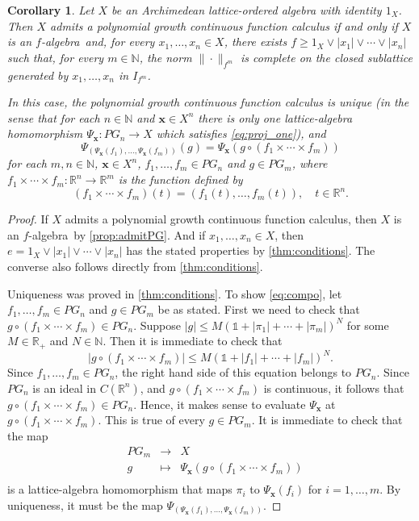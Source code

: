 \documentclass{amsart}
\theoremstyle{plain}
\newtheorem{cor}[thm]{Corollary}
\theoremstyle{definition}
\theoremstyle{remark}
\newcommand\N{\ensuremath{\mathbb{N}}}
\newcommand\R{\ensuremath{\mathbb{R}}}
\newcommand{\one}{\mathbb{1}}
\newcommand{\falg}{$f\!$-algebra}
\newcommand{\Psx}{\Psi_{\bm x}}
\begin{document}
\begin{cor}\label{cor:conditions}
    Let $X$ be an Archimedean lattice-ordered algebra with identity
    $1_X$. Then
    $X$ admits a polynomial growth continuous function calculus if and
    only if $X$ is an \falg\ and, for every $x_1,\ldots ,x_n \in X$,
    there exists $f\ge 1_X\vee |x_1|\vee \cdots
    \vee |x_n|$ such that, for every $m \in \N$, the norm
    $\|{\cdot }\|_{f^{m}}$ is complete on the closed sublattice
    generated by $x_1,\ldots ,x_n$ in $I_{f^{m}}$.

    In this case, the polynomial growth continuous function calculus
    is unique (in the sense that for each $n \in \N$ and $\bm x \in
    X^{n}$ there is only one lattice-algebra homomorphism $\Psx\colon
    PG_n\to X$ which satisfies \eqref{eq:proj_one}), and
    \begin{equation}\label{eq:compo}
        \Psi _{(\Psi _{\bm x}(f_1),\ldots ,\Psi _{\bm x}(f_m))}(g)=\Psi
        _{\bm x}(g\circ (f_1\times \cdots \times f_m))
    \end{equation}
    for each $m,n \in \N$, $\bm x \in X^{n}$, $f_1,\ldots ,f_m \in
    PG_n$ and $g \in PG_{m}$, where $f_1\times \cdots \times f_m\colon
    \R^{n}\to \R^{m}$ is the function defined by
    \[
        (f_1\times \cdots \times f_m)(t)=(f_1(t),\ldots ,f_m(t)),\quad
        t \in \R^{n}.
    \]
\end{cor}
\begin{proof}
    If $X$ admits a polynomial growth continuous function calculus,
    then $X$ is an \falg\ by \cref{prop:admitPG}. And if $x_1,\ldots ,x_n \in X$, then
    $e=1_X\vee|x_1|\vee \cdots \vee |x_n| $ has the stated properties
    by \cref{thm:conditions}. The converse also follows directly from \cref{thm:conditions}.

    Uniqueness was proved in \cref{thm:conditions}. To show
    \eqref{eq:compo}, let $f_1,\ldots ,f_m \in PG_n$ and $g \in PG_m$
    be as stated. First we need to check that $g\circ (f_1\times
    \cdots \times f_m) \in PG_n$. Suppose $|g|\le M (\one + |\pi _1| + \cdots +
    |\pi _m|)^{N}$ for some $M\in \R_+$ and $N \in \N$. Then it is immediate
    to check that
    \[
    |g\circ (f_1\times \cdots \times f_m)|\le M(\one + |f_1| + \cdots
    + |f_m|)^{N}.
    \]
    Since $f_1,\ldots ,f_m \in PG_n$, the right hand side of this
    equation belongs to $PG_n$. Since $PG_n$ is an ideal in
    $C(\R^{n})$, and $g\circ (f_1\times \cdots \times f_m)$ is
    continuous, it follows that $g\circ (f_1\times \cdots \times f_m)
    \in PG_n$. Hence, it makes sense to evaluate $\Psx$ at $g\circ (f_1\times
    \cdots \times f_m)$. This is true of every $g \in PG_m$.
    It is immediate to check that the map
    \[
    \begin{array}{cccc}
            & PG_m & \longrightarrow & X \\
            & g & \longmapsto & \Psx(g\circ (f_1\times \cdots \times
            f_m)) \\
    \end{array}
    \]
    is a lattice-algebra homomorphism that maps $\pi _i$ to $\Psx
    (f_i)$ for $i=1,\ldots ,m$. By uniqueness, it must be the map $\Psi
    _{(\Psx(f_1),\ldots ,\Psx(f_m))}$.
\end{proof}
\end{document}
